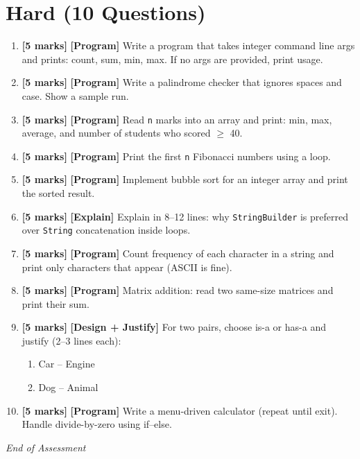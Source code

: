 \documentclass[11pt,a4paper]{article}
\newcommand{\HMarks}{\textbf{[5 marks]} }
\begin{document}
\section*{Hard (10 Questions)}
\begin{enumerate}[label=\textbf{H\arabic*.}, leftmargin=*]
  \item \HMarks \textbf{[Program]} Write a program that takes integer command line args and prints:
    count, sum, min, max. If no args are provided, print usage.

  \item \HMarks \textbf{[Program]} Write a palindrome checker that ignores spaces and case. Show a sample run.

  \item \HMarks \textbf{[Program]} Read \texttt{n} marks into an array and print:
    min, max, average, and number of students who scored $\ge$ 40.

  \item \HMarks \textbf{[Program]} Print the first \texttt{n} Fibonacci numbers using a loop.

  \item \HMarks \textbf{[Program]} Implement bubble sort for an integer array and print the sorted result.

  \item \HMarks \textbf{[Explain]} Explain in 8--12 lines: why \texttt{StringBuilder} is preferred over \texttt{String}
    concatenation inside loops.

  \item \HMarks \textbf{[Program]} Count frequency of each character in a string and print only characters that appear (ASCII is fine).

  \item \HMarks \textbf{[Program]} Matrix addition: read two same-size matrices and print their sum.

  \item \HMarks \textbf{[Design + Justify]} For two pairs, choose is-a or has-a and justify (2--3 lines each):
    \begin{enumerate}[label=(\alph*), leftmargin=*]
      \item Car -- Engine
      \item Dog -- Animal
    \end{enumerate}

  \item \HMarks \textbf{[Program]} Write a menu-driven calculator (repeat until exit). Handle divide-by-zero using if--else.
\end{enumerate}

\vfill
\noindent\textit{End of Assessment}
\end{document}
